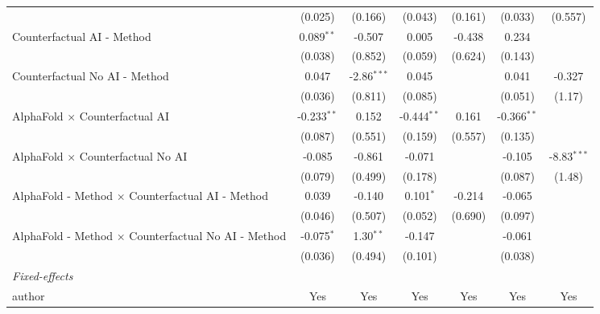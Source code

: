 \begin{tabular}{lcccccc}
                                                              & (0.025)       & (0.166)       & (0.043)       & (0.161)      & (0.033)       & (0.557)\\   
   Counterfactual AI - Method                                 & 0.089$^{**}$  & -0.507        & 0.005         & -0.438       & 0.234         &   \\   
                                                              & (0.038)       & (0.852)       & (0.059)       & (0.624)      & (0.143)       &   \\   
   Counterfactual No AI - Method                              & 0.047         & -2.86$^{***}$ & 0.045         &              & 0.041         & -0.327\\   
                                                              & (0.036)       & (0.811)       & (0.085)       &              & (0.051)       & (1.17)\\   
   AlphaFold $\times$ Counterfactual AI                       & -0.233$^{**}$ & 0.152         & -0.444$^{**}$ & 0.161        & -0.366$^{**}$ &   \\   
                                                              & (0.087)       & (0.551)       & (0.159)       & (0.557)      & (0.135)       &   \\   
   AlphaFold $\times$ Counterfactual No AI                    & -0.085        & -0.861        & -0.071        &              & -0.105        & -8.83$^{***}$\\   
                                                              & (0.079)       & (0.499)       & (0.178)       &              & (0.087)       & (1.48)\\   
   AlphaFold - Method $\times$ Counterfactual AI - Method     & 0.039         & -0.140        & 0.101$^{*}$   & -0.214       & -0.065        &   \\   
                                                              & (0.046)       & (0.507)       & (0.052)       & (0.690)      & (0.097)       &   \\   
   AlphaFold - Method $\times$ Counterfactual No AI - Method  & -0.075$^{*}$  & 1.30$^{**}$   & -0.147        &              & -0.061        &   \\   
                                                              & (0.036)       & (0.494)       & (0.101)       &              & (0.038)       &   \\   
   \midrule
   \emph{Fixed-effects}\\
   author                                                     & Yes           & Yes           & Yes           & Yes          & Yes           & Yes\\  

\end{tabular}
